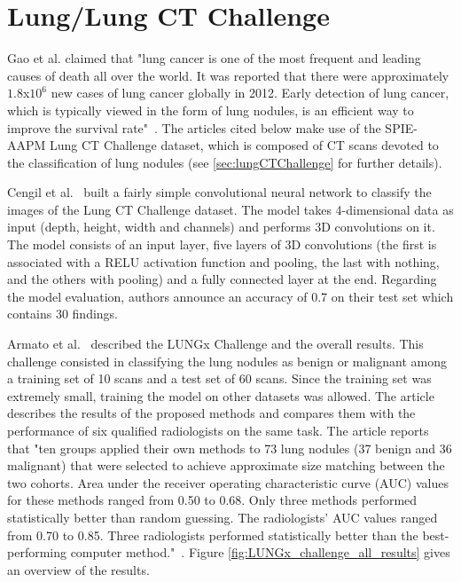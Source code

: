 \section{Lung/Lung CT Challenge}
Gao et al. claimed that "lung cancer is one of the most frequent and leading causes of death all over the world. It was reported that there were approximately $1.8$x$10^6$ new cases of lung cancer globally in 2012. Early detection of lung cancer, which is typically viewed in the form of lung nodules, is an efficient way to improve the survival rate"~\cite{41}. The articles cited below make use of the SPIE-AAPM Lung CT Challenge dataset, which is composed of CT scans devoted to the classification of lung nodules (see \ref{sec:lungCTChallenge} for further details).

Cengil et al.~\cite{02} built a fairly simple convolutional neural network to classify the images of the Lung CT Challenge dataset. The model takes 4-dimensional data as input (depth, height, width and channels) and performs 3D convolutions on it. The model consists of an input layer, five layers of 3D convolutions (the first is associated with a RELU activation function and pooling, the last with nothing, and the others with pooling) and a fully connected layer at the end. Regarding the model evaluation, authors announce an accuracy of 0.7 on their test set which contains 30 findings.

Armato et al.~\cite{12} described the LUNGx Challenge and the overall results. This challenge consisted in classifying the lung nodules as benign or malignant among a training set of 10 scans and a test set of 60 scans. Since the training set was extremely small, training the model on other datasets was allowed. The article describes the results of the proposed methods and compares them with the performance of six qualified radiologists on the same task. The article reports that "ten groups applied their own methods to 73 lung nodules (37 benign and 36 malignant) that were selected to achieve approximate size matching between the two cohorts. Area under the receiver operating characteristic curve (AUC) values for these methods ranged from 0.50 to 0.68. Only three methods performed statistically better than random guessing. The radiologists’ AUC values ranged from 0.70 to 0.85. Three radiologists performed statistically better than the best-performing computer method."~\cite{12}. Figure \ref{fig:LUNGx_challenge_all_results} gives an overview of the results.

